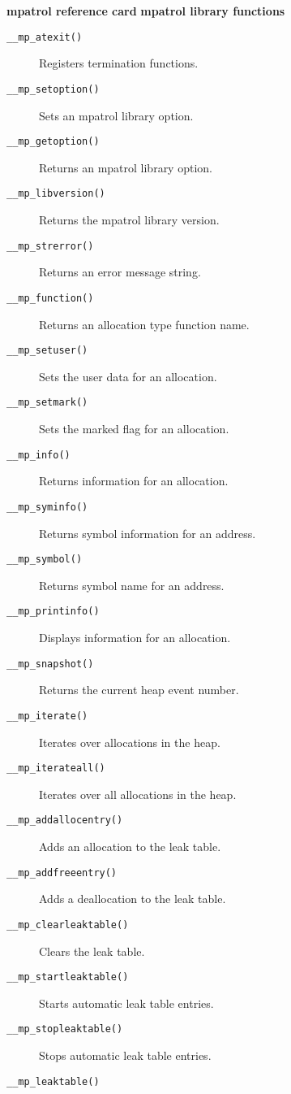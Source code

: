 \documentclass[a4paper,landscape,final]{article}
\newcommand{\heading}[1]{\textbf{\normalsize #1}}
\newcommand{\function}[1]{\texttt{#1()}}
\begin{document}
\begin{multicols}{3}{\textbf{\Large mpatrol reference card}}
\vskip 12pt
\heading{mpatrol library functions}
\vskip 6pt

\begin{description}
\item[\function{\_\_mp\_atexit}]
\hfill Registers termination functions.
\item[\function{\_\_mp\_setoption}]
\hfill Sets an mpatrol library option.
\item[\function{\_\_mp\_getoption}]
\hfill Returns an mpatrol library option.
\item[\function{\_\_mp\_libversion}]
\hfill Returns the mpatrol library version.
\item[\function{\_\_mp\_strerror}]
\hfill Returns an error message string.
\item[\function{\_\_mp\_function}]
\hfill Returns an allocation type function name.
\item[\function{\_\_mp\_setuser}]
\hfill Sets the user data for an allocation.
\item[\function{\_\_mp\_setmark}]
\hfill Sets the marked flag for an allocation.
\item[\function{\_\_mp\_info}]
\hfill Returns information for an allocation.
\item[\function{\_\_mp\_syminfo}]
\hfill Returns symbol information for an address.
\item[\function{\_\_mp\_symbol}]
\hfill Returns symbol name for an address.
\item[\function{\_\_mp\_printinfo}]
\hfill Displays information for an allocation.
\item[\function{\_\_mp\_snapshot}]
\hfill Returns the current heap event number.
\item[\function{\_\_mp\_iterate}]
\hfill Iterates over allocations in the heap.
\item[\function{\_\_mp\_iterateall}]
\hfill Iterates over all allocations in the heap.
\item[\function{\_\_mp\_addallocentry}]
\hfill Adds an allocation to the leak table.
\item[\function{\_\_mp\_addfreeentry}]
\hfill Adds a deallocation to the leak table.
\item[\function{\_\_mp\_clearleaktable}]
\hfill Clears the leak table.
\item[\function{\_\_mp\_startleaktable}]
\hfill Starts automatic leak table entries.
\item[\function{\_\_mp\_stopleaktable}]
\hfill Stops automatic leak table entries.
\item[\function{\_\_mp\_leaktable}]

\end{description}
\end{multicols}
\end{document}
